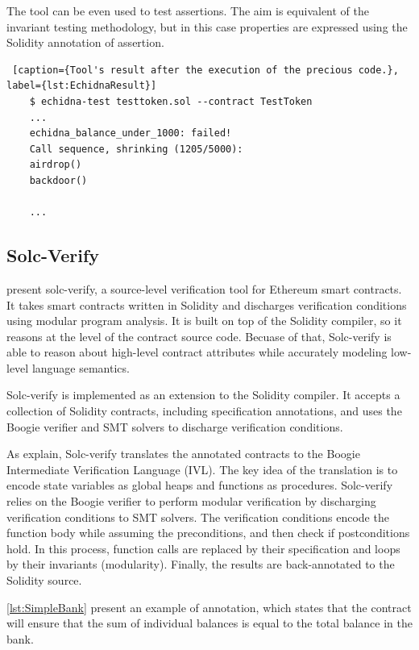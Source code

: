 The tool can be even used to test assertions. 
The aim is equivalent of the invariant testing methodology, 
but in this case properties are expressed using the Solidity annotation of assertion.

\begin{lstlisting} [caption={Tool's result after the execution of the precious code.}, label={lst:EchidnaResult}]
    $ echidna-test testtoken.sol --contract TestToken
    ...
    echidna_balance_under_1000: failed!
    Call sequence, shrinking (1205/5000):
    airdrop()
    backdoor()

    ...
\end{lstlisting}


\subsection{Solc-Verify}
\label{sec:Specification:Solc-Verify}

\citet{SolcVerify} present solc-verify, a source-level verification tool for
Ethereum smart contracts. It takes smart contracts written
in Solidity and discharges verification conditions using modular program
analysis. It is built on top of the Solidity compiler, so it reasons at the level of the contract source code. 
Becuase of that, Solc-verify is able to reason about high-level contract attributes 
while accurately modeling low-level language semantics.

Solc-verify is implemented as an extension to the Solidity compiler.
It accepts a collection of Solidity contracts, including specification annotations, and uses 
the Boogie verifier and SMT solvers to discharge verification conditions. 

As \citet{SolcVerify_2} explain, Solc-verify translates the annotated contracts to the Boogie Intermediate Verification
Language (IVL). The key idea of the translation is to encode state variables as global heaps
and functions as procedures. Solc-verify relies on the Boogie verifier to perform modular
verification by discharging verification conditions to SMT solvers. The verification conditions
encode the function body while assuming the preconditions, and then check if postconditions
hold. In this process, function calls are replaced by their specification and loops by their
invariants (modularity). Finally, the results are back-annotated to the Solidity source.

\autoref{lst:SimpleBank} present an example of annotation, which states that the contract will ensure
that the sum of individual balances is equal to the total balance in the bank.


